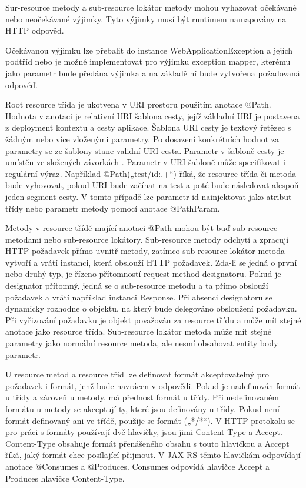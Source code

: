 \documentclass[11pt,twoside,a4paper]{book}
\begin{document}
Sur-resource metody a sub-resource lokátor metody mohou vyhazovat očekávané nebo
neočekávané výjimky. Tyto výjimky musí být runtimem namapovány na HTTP odpověd.

Očekávanou výjimku lze přebalit do instance WebApplicationException a jejích podtříd nebo
je možné implementovat pro výjimku exception mapper, kterému jako parametr bude předána
výjimka a na základě ní bude vytvořena požadovaná odpověď.

Root resource třída je ukotvena v URI prostoru použitím anotace @Path. Hodnota v anotaci je
relativní URI šablona cesty, jejíž základní URI je postavena z deployment kontextu a cesty
aplikace. Šablona URI cesty je textový řetězec s žádným nebo více vloženými parametry. Po
dosazení konkrétních hodnot za parametry se ze šablony stane validní URI cesta. Parametr v
šabloně cesty je umístěn ve složených závorkách {}. Parametr v URI šabloně může
specifikovat i regulární výraz. Například @Path(„test/{id:.+}“) říká, že resource třída či
metoda bude vyhovovat, pokud URI bude začínat na test a poté bude následovat alespoň jeden
segment cesty. V tomto případě lze parametr id nainjektovat jako atribut třídy nebo parametr
metody pomocí anotace @PathParam.

Metody v resource třídě mající anotaci @Path mohou být buď sub-resource metodami nebo
sub-resource lokátory. Sub-resource metody odchytí a zpracují HTTP požadavek přímo uvnitř
metody, zatímco sub-resource lokátor metoda vytvoří a vrátí instanci, která obslouží HTTP
požadavek. Zda-li se jedná o první nebo druhý typ, je řízeno přítomností request method
designatoru. Pokud je designator přítomný, jedná se o sub-resource metodu a ta přímo
obslouží požadavek a vrátí například instanci Response. Při absenci designatoru se dynamicky
rozhodne o objektu, na který bude delegováno obsloužení požadavku. Při vyřizování
požadavku je objekt považován za resource třídu a může mít stejné anotace jako resource
třída. Sub-resource lokátor metoda může mít stejné parametry jako normální resource metoda,
ale nesmí obsahovat entity body parametr.

U resource metod a resource třid lze definovat formát akceptovatelný pro požadavek i formát,
jenž bude navrácen v odpovědi. Pokud je nadefinován formát u třídy a zároveň u metody, má
přednost formát u třídy. Při nedefinovaném formátu u metody se akceptují ty, které jsou
definovány u třídy. Pokud není formát definovaný ani ve třídě, použije se formát („*/*“). V
HTTP protokolu se pro práci s formáty používají dvě hlavičky, jsou jimi Content-Type a
Accept. Content-Type obsahuje formát přenášeného obsahu s touto hlavičkou a Accept říká,
jaký formát chce posílající přijmout. V JAX-RS těmto hlavičkám odpovídají anotace
@Consumes a @Produces. Consumes odpovídá hlavičce Accept a Produces hlavičce
Content-Type.
\end{document}

